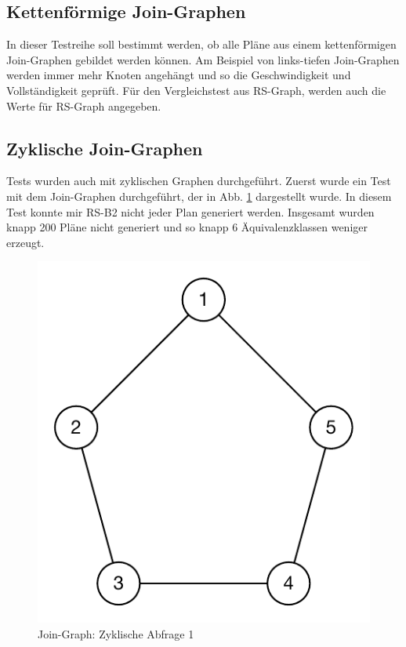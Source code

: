 \subsection{Kettenförmige Join-Graphen}

In dieser Testreihe soll bestimmt werden, ob alle Pläne aus einem kettenförmigen Join-Graphen gebildet werden können. Am Beispiel von links-tiefen Join-Graphen werden immer mehr Knoten angehängt und so die Geschwindigkeit und Vollständigkeit geprüft. Für den Vergleichstest aus RS-Graph, werden auch die Werte für RS-Graph angegeben.


\subsection{Zyklische Join-Graphen}
Tests wurden auch mit zyklischen Graphen durchgeführt. Zuerst wurde ein Test mit dem Join-Graphen durchgeführt, der in Abb. \ref{CylceJoin1} dargestellt wurde. In diesem Test konnte mir RS-B2 nicht jeder Plan generiert werden. Insgesamt wurden knapp 200 Pläne nicht generiert und so knapp 6 Äquivalenzklassen weniger erzeugt. 


\begin{figure}[ht]
  \centering
  \includegraphics[scale=0.75]{05_ResultsEvaluation/00_media/CycleJoin1.pdf}
  \caption{Join-Graph: Zyklische Abfrage 1}
  \label{CylceJoin1}
\end{figure}






